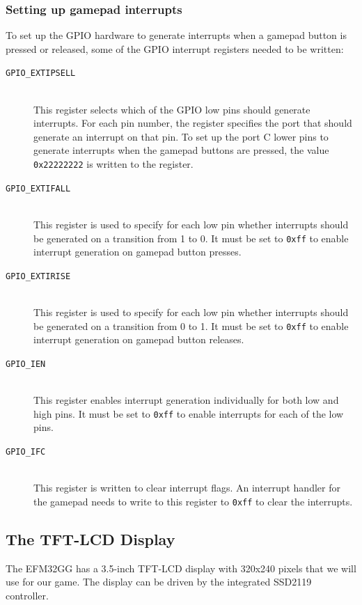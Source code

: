 \subsubsection{Setting up gamepad interrupts}\label{sec:gpio-interrupts}
To set up the GPIO hardware to generate interrupts when a gamepad button is pressed or released, some of the GPIO interrupt registers needed to be written:
\begin{description}
  \item[\texttt{GPIO\_EXTIPSELL}] \hfill \\
    This register selects which of the GPIO low pins should generate interrupts. For each pin number, the register specifies the port that should generate an interrupt on that pin. To set up the port C lower pins to generate interrupts when the gamepad buttons are pressed, the value \texttt{0x22222222} is written to the register.
  \item[\texttt{GPIO\_EXTIFALL}] \hfill \\
    This register is used to specify for each low pin whether interrupts should be generated on a transition from 1 to 0. It must be set to \texttt{0xff} to enable interrupt generation on gamepad button presses.
  \item[\texttt{GPIO\_EXTIRISE}] \hfill \\
    This register is used to specify for each low pin whether interrupts should be generated on a transition from 0 to 1. It must be set to \texttt{0xff} to enable interrupt generation on gamepad button releases.
  \item[\texttt{GPIO\_IEN}] \hfill \\
    This register enables interrupt generation individually for both low and high pins. It must be set to \texttt{0xff} to enable interrupts for each of the low pins.
  \item[\texttt{GPIO\_IFC}] \hfill \\
    This register is written to clear interrupt flags. An interrupt handler for the gamepad needs to write to this register to \texttt{0xff} to clear the interrupts.
\end{description}


\subsection{The TFT-LCD Display}
The EFM32GG has a 3.5-inch TFT-LCD display with 320x240 pixels that we will use for our game. The display can be driven by the integrated SSD2119 controller. 

